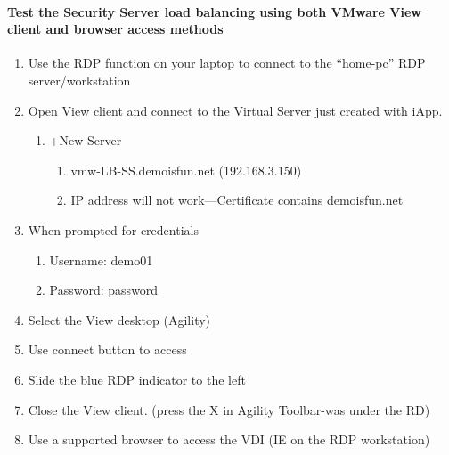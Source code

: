 \documentclass[letterpaper,10pt,english]{sphinxmanual}
\begin{document}
\paragraph{Test the Security Server load balancing using both VMware View client and browser access methods}
\label{\detokenize{class2/module1/lab1:test-the-security-server-load-balancing-using-both-vmware-view-client-and-browser-access-methods}}\begin{enumerate}
\item {} 
Use the RDP function on your laptop to connect to the “home-pc” RDP
server/workstation

\item {} 
Open View client and connect to the Virtual Server just created with
iApp.
\begin{enumerate}
\item {} 
+New Server
\begin{enumerate}
\item {} 
vmw-LB-SS.demoisfun.net (192.168.3.150)

\item {} 
IP address will not work—Certificate contains demoisfun.net

\end{enumerate}

\end{enumerate}

\item {} 
When prompted for credentials
\begin{enumerate}
\item {} 
Username: demo01

\item {} 
Password: password

\end{enumerate}

\item {} 
Select the View desktop (Agility)

\item {} 
Use connect button to access

\item {} 
Slide the blue RDP indicator to the left

\item {} 
Close the View client. (press the X in Agility Toolbar-was under the
RD)

\item {} 
Use a supported browser to access the VDI (IE on the RDP
workstation)



\end{enumerate}
\end{document}
